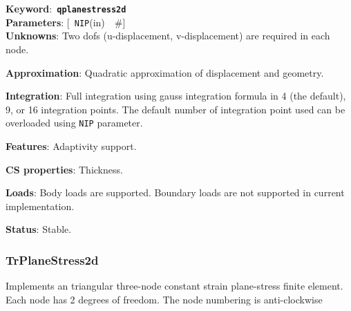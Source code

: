 \documentclass[a4paper]{article}
\newcommand{\descitem}[1]{{\noindent \bf #1}:}
\newcommand{\elemkeyword}[1]{\descitem{Keyword}~{\bf \texttt{#1}}}
\newcommand{\elemparam}[2]{{{\texttt{#1}\tiny (#2)}~~\#}}
\newcommand{\optelemparam}[2]{{[~\elemparam{#1}{#2}]}}
\newcommand{\param}[1]{{\texttt{#1}}}
\begin{document}
\elemkeyword{qplanestress2d}\\
\descitem{Parameters} \optelemparam{NIP}{in}\\
\descitem{Unknowns}
Two dofs (u-displacement, v-displacement) are required in each node.

\descitem{Approximation} Quadratic approximation of displacement and
geometry.

\descitem{Integration}
Full integration using gauss integration formula
in 4 (the default), 9, or 16 integration points. The default number of
integration point used can be overloaded using \param{NIP} parameter.

\descitem{Features} Adaptivity support.

\descitem{CS properties} Thickness. 

\descitem{Loads} Body loads are supported. Boundary loads are
not supported in current implementation.

\descitem{Status} Stable.

\subsubsection{TrPlaneStress2d}
Implements an triangular three-node  constant strain plane-stress  
finite element. Each node has 2 degrees of freedom.
The node numbering is anti-clockwise
\end{document}
